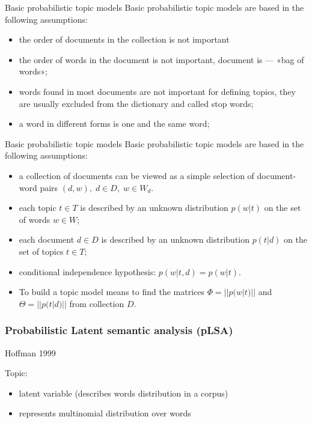\documentclass[svgnames]{beamer}
\begin{document}
    \begin{frame}{Basic probabilistic topic models}
        Basic probabilistic topic models are based in the following assumptions:
        \begin{itemize}
            \item the order of documents in the collection is not important
            \item the order of words in the document is not important, document is — «bag of words»;
            \item words found in most documents are not important for defining topics, they are usually excluded from the dictionary and called stop words;
            \item a word in different forms is one and the same word;
        \end{itemize}
    \end{frame}

    \begin{frame}{Basic probabilistic topic models}
        Basic probabilistic topic models are based in the following assumptions:
        \begin{itemize}
            \item a collection of documents can be viewed as a simple selection of document-word pairs $(d,w),\; d\in D,\; w\in W_d.$
            \item each topic $t\in T$ is described by an unknown distribution $p(w|t)$ on the set of words $w\in W$;
            \item each document $d\in D$ is described by an unknown distribution $p(t|d)$ on the set of topics $t\in T$;
            \item conditional independence hypothesis: $p(w|t,d)=p(w|t)$.
            \item To build a topic model means to find the matrices $\Phi = ||p(w|t)||$ and $\Theta = ||p(t|d)||$ from collection $D$.
        \end{itemize}
    \end{frame}


    \begin{frame}
        \frametitle{Probabilistic Latent semantic analysis (pLSA)}
        Hoffman 1999

        Topic:
        \begin{itemize}
            \item \alert{latent} variable (describes words distribution in a corpus)
            \item represents multinomial distribution over words
        \end{itemize}

    \end{frame}
\end{document}
